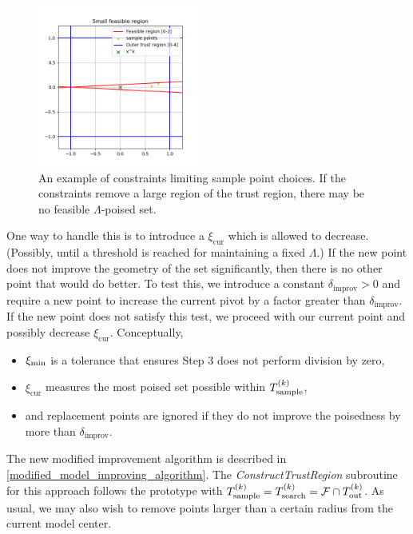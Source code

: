 \begin{figure}[ht]
    \centering
    \includegraphics[width=200px]{images/small_sample_region.png}
    \caption[An example of constraints limiting sample point choices.]
    	{An example of constraints limiting sample point choices.
    	If the constraints remove a large region of the trust region, there may be no feasible $\Lambda$-poised set.
    }
    \label{lspc}
\end{figure}


One way to handle this is to introduce a $\xi_{\text{cur}}$ which is allowed to decrease.
(Possibly, until a threshold is reached for maintaining a fixed $\Lambda$.)
If the new point does not improve the geometry of the set significantly, then there is no other point that would do better.
To test this, we introduce a constant $\delta_{\text{improv}}>0$ and require a new point to increase the current pivot by a factor greater than $\delta_{\text{improv}}$.
If the new point does not satisfy this test, we proceed with our current point and possibly decrease $\xi_{\text{cur}}$.
Conceptually, 
\begin{itemize}
\item $\xi_{\text{min}}$ is a tolerance that ensures Step 3 does not perform division by zero,
\item $\xi_{\text{cur}}$ measures the most poised set possible within ${T_{\text{sample}}^{(k)}}$,
\item and replacement points are ignored if they do not improve the poisedness by more than $\delta_{\text{improv}}$.
\end{itemize}
The new modified improvement algorithm is described in \cref{modified_model_improving_algorithm}.
The \emph{ConstructTrustRegion} subroutine for this approach follows the prototype with ${T_{\text{sample}}^{(k)}} = {T_{\text{search}}^{(k)}} = {\mathcal F} \cap {T_{\text{out}}^{(k)}} $.
As usual, we may also wish to remove points larger than a certain radius from the current model center.

